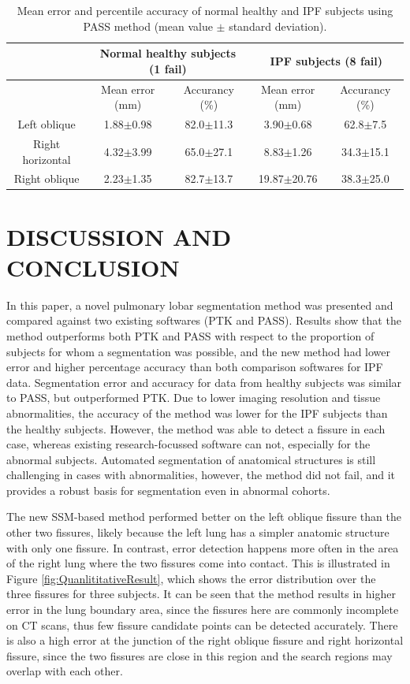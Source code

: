\documentclass[]{spie}  %
\begin{document}
{\begin{table}[htbp]
\centering
\caption{Mean error and percentile accuracy of normal healthy and IPF subjects using PASS method (mean value $\pm$ standard deviation).}
\label{tab:PASSQuantitativeResult}
\begin{tabular}{| c | c | c | c | c |}
\hline
~ & \multicolumn{2}{|c|}{\bf{Normal healthy subjects (1 fail)}} & \multicolumn{2}{|c|}{\bf{IPF subjects (8 fail)}}\\ 
\hline
~ & Mean error (mm) & Accurancy (\%) & Mean error (mm) & Accurancy (\%)\\	
\hline
Left oblique & 1.88$\pm$0.98 & 82.0$\pm$11.3 & 3.90$\pm$0.68 & 62.8$\pm$7.5\\
\hline
Right horizontal & 4.32$\pm$3.99 & 65.0$\pm$27.1 & 8.83$\pm$1.26 & 34.3$\pm$15.1\\
\hline
Right oblique & 2.23$\pm$1.35 & 82.7$\pm$13.7 & 19.87$\pm$20.76 & 38.3$\pm$25.0\\						
\hline
\end{tabular}
\end{table}


\section{DISCUSSION AND CONCLUSION}
In this paper, a novel pulmonary lobar segmentation method was presented and compared against two existing softwares (PTK and PASS). Results show that the method outperforms both PTK and PASS with respect to the proportion of subjects for whom a segmentation was possible, and the new method had lower error and higher percentage accuracy than both comparison softwares for IPF data. Segmentation error and accuracy for data from healthy subjects was similar to PASS, but outperformed PTK. Due to lower imaging resolution and tissue abnormalities, the accuracy of the method was lower for the IPF subjects than the healthy subjects. However, the method was able to detect a fissure in each case, whereas existing research-focussed software can not, especially for the abnormal subjects. Automated segmentation of anatomical structures is still challenging in cases with abnormalities, however, the method did not fail, and it provides a robust basis for segmentation even in abnormal cohorts.

The new SSM-based method performed better on the left oblique fissure than the other two fissures, likely because the left lung has a simpler anatomic structure with only one fissure. In contrast, error detection happens more often in the area of the right lung where the two fissures come into contact. This is illustrated in Figure \ref{fig:QuanlititativeResult}, which shows the error distribution over the three fissures for three subjects. It can be seen that the method results in higher error in the lung boundary area, since the fissures here are commonly incomplete on CT scans, thus few fissure candidate points can be detected accurately. There is also a high error at the junction of the right oblique fissure and right horizontal fissure, since the two fissures are close in this region and the search regions may overlap with each other.

}
\end{document}
